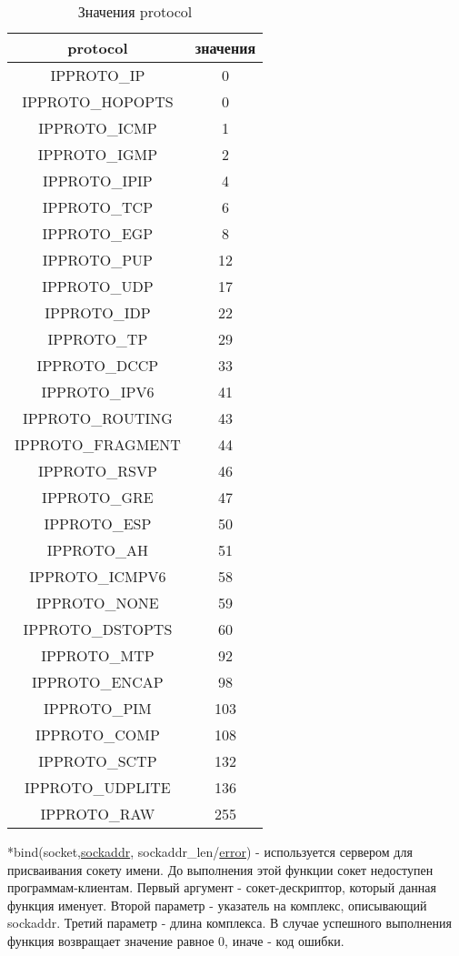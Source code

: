 \documentclass[12t]{article}
\begin{document}
\begin{table}[H]
\caption{\label{protocol}Значения protocol}
\begin{center}
\begin{tabular}{|c|c|}
\hline
protocol & значения \\
\hline
IPPROTO\_IP & 0 \\
IPPROTO\_HOPOPTS & 0 \\
IPPROTO\_ICMP & 1 \\
IPPROTO\_IGMP & 2 \\
IPPROTO\_IPIP & 4 \\
IPPROTO\_TCP & 6 \\
IPPROTO\_EGP & 8 \\
IPPROTO\_PUP & 12 \\
IPPROTO\_UDP & 17 \\
IPPROTO\_IDP & 22 \\
IPPROTO\_TP & 29 \\
IPPROTO\_DCCP & 33 \\
IPPROTO\_IPV6 & 41 \\
IPPROTO\_ROUTING & 43 \\
IPPROTO\_FRAGMENT & 44 \\
IPPROTO\_RSVP & 46 \\
IPPROTO\_GRE & 47 \\
IPPROTO\_ESP & 50 \\
IPPROTO\_AH & 51 \\
IPPROTO\_ICMPV6 & 58 \\
IPPROTO\_NONE & 59 \\
IPPROTO\_DSTOPTS & 60 \\
IPPROTO\_MTP & 92 \\
IPPROTO\_ENCAP & 98 \\
IPPROTO\_PIM & 103 \\
IPPROTO\_COMP & 108 \\
IPPROTO\_SCTP & 132 \\
IPPROTO\_UDPLITE & 136 \\
IPPROTO\_RAW & 255 \\
\hline
\end{tabular}
\end{center}
\end{table}

\label{bind}
*bind(socket,\hyperref[sockaddr]{sockaddr}, sockaddr\_len/\hyperref[error]{error}) - используется сервером для присваивания сокету имени. До выполнения этой функции сокет недоступен программам-клиентам. Первый аргумент - сокет-дескриптор, который данная функция именует. Второй параметр - указатель на комплекс, описывающий sockaddr. Третий параметр - длина комплекса. В случае успешного выполнения функция возвращает значение равное 0, иначе - код ошибки.
\end{document}

